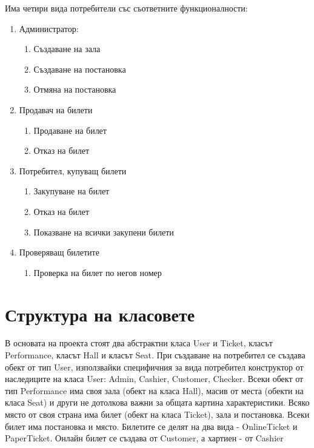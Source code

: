 \documentclass[12pt]{article}
\begin{document}
    Има четири вида потребители със съответните функционалности:

    \begin{enumerate}
        \item Администратор:
            \begin{enumerate}
                \item Създаване на зала
                \item Създаване на постановка
                \item Отмяна на постановка
            \end{enumerate}
        \item Продавач на билети
            \begin{enumerate}
                \item Продаване на билет
                \item Отказ на билет
            \end{enumerate}
        \item Потребител, купуващ билети
            \begin{enumerate}
                \item Закупуване на билет
                \item Отказ на билет
                \item Показване на всички закупени билети
            \end{enumerate}
        \item Проверяващ билетите
            \begin{enumerate}
                \item Проверка на билет по негов номер
            \end{enumerate}
    \end{enumerate}

\section{Структура на класовете}

    В основата на проекта стоят два абстрактни класа User и Ticket, класът Performance, класът Hall и класът Seat. При създаване на потребител се създава обект от тип User, използвайки специфичния за вида потребител конструктор от наследиците на класа User: Admin, Cashier, Customer, Checker. Всеки обект от тип Performance има своя зала (обект на класа Hall), масив от места (обекти на класа Seat) и други не дотолкова важни за общата картина характеристики. Всяко място от своя страна има билет (обект на класа Ticket), зала и постановка. Всеки билет има постановка и място. Билетите се делят на два вида - OnlineTicket и PaperTicket. Онлайн билет се създава от Customer, а хартиен - от Cashier
\end{document}
